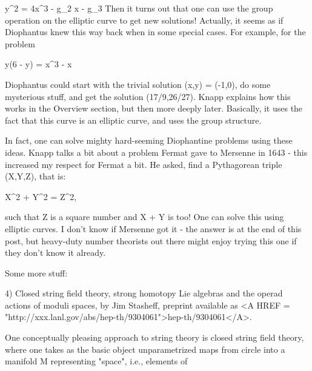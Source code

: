    y^{2} = 4x^{3} - g_{2} x - g_{3}
Then it turns out that one can use the group operation on the elliptic
curve to get new solutions!   Actually, it seems as if Diophantus knew
this way back when in some special cases.  For example, for the problem  

                      y(6 - y) = x^{3} - x

Diophantus could start with the trivial solution (x,y) = (-1,0), do some
mysterious stuff, and get the solution (17/9,26/27).  Knapp explains how
this works in the Overview section, but then more deeply later.
Basically, it uses the fact that this curve is an elliptic curve, and
uses the group structure.  

In fact, one can solve mighty hard-seeming Diophantine problems using
these ideas.  Knapp talks a bit about a problem Fermat gave to Mersenne
in 1643 - this increased my respect for Fermat a bit.  He asked, find a
Pythagorean triple (X,Y,Z), that is:

                      X^{2} + Y^{2} = Z^{2},

such that Z is a square number and X + Y is too!  One can solve this
using elliptic curves.  I don't know if Mersenne got it - the answer is
at the end of this post, but heavy-duty number theorists out there
might enjoy trying this one if they don't know it already.

Some more stuff:

4) Closed string field theory, strong homotopy Lie algebras and the
operad actions of moduli spaces, by Jim Stasheff, preprint available as
<A HREF = "http://xxx.lanl.gov/abs/hep-th/9304061">hep-th/9304061</A>.  

One conceptually pleasing approach to string theory is closed string field
theory, where one takes as the basic object unparametrized maps from
circle into a manifold M representing "space", i.e., elements of

